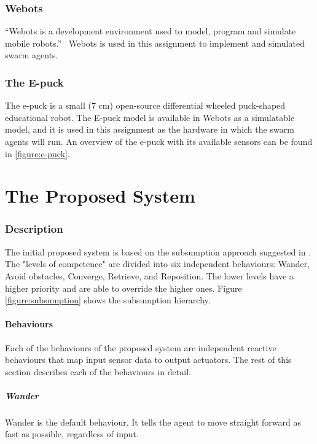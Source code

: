 \documentclass[a4paper]{article}
\begin{document}
\section{Webots}

``Webots is a development environment used to model, program and simulate mobile robots.''~\cite{webots}
Webots is used in this assignment to implement and simulated swarm agents.

\section{The E-puck}

The e-puck is a small (7 cm) open-source differential wheeled puck-shaped educational robot.
The E-puck model is available in Webots as a simulatable model, and it is used in this assignment as the hardware in which the swarm agents will run.
An overview of the e-puck with its available sensors can be found in \vref{figure:e-puck}.

\part{The Proposed System}
\label{part:improved-system}

\section{Description}

The initial proposed system is based on the subsumption approach suggested in \cite{assignment}.
The "levels of competence" are divided into six independent behaviours: Wander, Avoid obstacles, Converge, Retrieve, and Reposition.
The lower levels have a higher priority and are able to override the higher ones.
Figure \vref{figure:subsumption} shows the subsumption hierarchy.



\subsection{Behaviours}
Each of the behaviours of the proposed system are independent reactive behaviours that map input sensor data to output actuators. The rest of this section describes each of the behaviours in detail.

\subsubsection{Wander}
Wander is the default behaviour.
It tells the agent to move straight forward as fast as possible, regardless of input.
\end{document}
